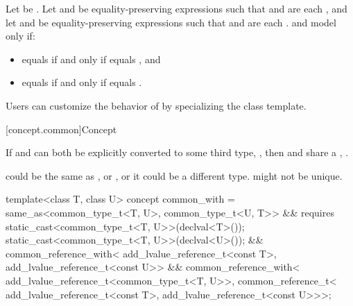 \begin{itemdescr}
\pnum
Let  be .
Let  and  be equality-preserving
expressions such that
 and  are each , and
let  and  be equality-preserving expressions such that
 and  are each .
 and  model 
only if:
\begin{itemize}
\item {} equals  if and only if
   equals , and
\item {} equals  if and only if
   equals .
\end{itemize}

\pnum
\begin{note}
Users can customize the behavior of  by specializing
the  class template.
\end{note}
\end{itemdescr}

[concept.common]{Concept }

\pnum
If  and  can both be explicitly converted to some third type,
, then  and  share a ,
.
\begin{note}
 could be the same as , or , or it could be a
different type.  might not be unique.
\end{note}

%
\begin{itemdecl}
template<class T, class U>
  concept common_with =
    same_as<common_type_t<T, U>, common_type_t<U, T>> &&
    requires {
      static_cast<common_type_t<T, U>>(declval<T>());
      static_cast<common_type_t<T, U>>(declval<U>());
    } &&
    common_reference_with<
      add_lvalue_reference_t<const T>,
      add_lvalue_reference_t<const U>> &&
    common_reference_with<
      add_lvalue_reference_t<common_type_t<T, U>>,
      common_reference_t<
        add_lvalue_reference_t<const T>,
        add_lvalue_reference_t<const U>>>;
\end{itemdecl}


